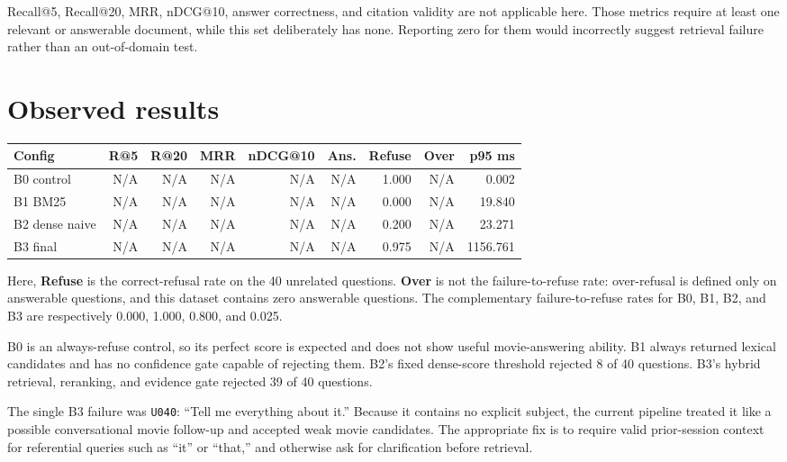 \documentclass[11pt]{article}
\begin{document}
Recall@5, Recall@20, MRR, nDCG@10, answer correctness, and citation validity
are not applicable here. Those metrics require at least one relevant or
answerable document, while this set deliberately has none. Reporting zero for
them would incorrectly suggest retrieval failure rather than an
out-of-domain test.

\section{Observed results}

\begin{center}
\small
\begin{tabular}{lrrrrrrrr}
\hline
Config & R@5 & R@20 & MRR & nDCG@10 & Ans. & Refuse & Over & p95 ms \\
\hline
B0 control & N/A & N/A & N/A & N/A & N/A & 1.000 & N/A & 0.002 \\
B1 BM25 & N/A & N/A & N/A & N/A & N/A & 0.000 & N/A & 19.840 \\
B2 dense naive & N/A & N/A & N/A & N/A & N/A & 0.200 & N/A & 23.271 \\
B3 final & N/A & N/A & N/A & N/A & N/A & 0.975 & N/A & 1156.761 \\
\hline
\end{tabular}
\normalsize
\end{center}

Here, \textbf{Refuse} is the correct-refusal rate on the 40 unrelated
questions. \textbf{Over} is not the failure-to-refuse rate: over-refusal is
defined only on answerable questions, and this dataset contains zero
answerable questions. The complementary failure-to-refuse rates for B0, B1,
B2, and B3 are respectively 0.000, 1.000, 0.800, and 0.025.

B0 is an always-refuse control, so its perfect score is expected and does not
show useful movie-answering ability. B1 always returned lexical candidates
and has no confidence gate capable of rejecting them. B2's fixed dense-score
threshold rejected 8 of 40 questions. B3's hybrid retrieval, reranking, and
evidence gate rejected 39 of 40 questions.

The single B3 failure was \texttt{U040}: ``Tell me everything about it.''
Because it contains no explicit subject, the current pipeline treated it like
a possible conversational movie follow-up and accepted weak movie candidates.
The appropriate fix is to require valid prior-session context for referential
queries such as ``it'' or ``that,'' and otherwise ask for clarification before
retrieval.
\end{document}
